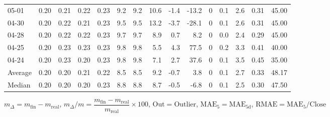 \begin{threeparttable}
{\begin{tabular}{lrrrrrrrrrrrrrr}
  05-01 &          0.20 &          0.21 &          0.22 &        0.23 &                 9.2 &                9.2 &                10.6 &       -1.4 &        -13.2 &              0 &                 0.1 &              2.6 &            0.31 &                  45.00 \\
  04-30 &          0.20 &          0.22 &          0.21 &        0.23 &                 9.5 &                9.5 &                13.2 &       -3.7 &        -28.1 &              0 &                 0.1 &              2.6 &            0.31 &                  45.00 \\
  04-28 &          0.20 &          0.22 &          0.22 &        0.23 &                 9.7 &                9.7 &                 8.9 &        0.7 &          8.2 &              0 &                 0.0 &              2.4 &            0.29 &                  45.00 \\
  04-25 &          0.20 &          0.23 &          0.23 &        0.23 &                 9.8 &                9.8 &                 5.5 &        4.3 &         77.5 &              0 &                 0.2 &              3.3 &            0.41 &                  40.00 \\
  04-24 &          0.20 &          0.23 &          0.20 &        0.23 &                 9.8 &                9.8 &                 7.1 &        2.7 &         37.6 &              0 &                 0.1 &              3.5 &            0.45 &                  35.00 \\
Average &          0.20 &          0.20 &          0.21 &        0.22 &                 8.5 &                8.5 &                 9.2 &       -0.7 &          3.8 &              0 &                 0.1 &              2.7 &            0.33 &                  48.17 \\
 Median &          0.20 &          0.20 &          0.20 &        0.23 &                 8.8 &                8.8 &                 8.7 &       -0.5 &         -6.8 &              0 &                 0.1 &              2.5 &            0.30 &                  47.50 \\
\bottomrule
\end{tabular}
}
\begin{tablenotes}\footnotesize
\item $m_\Delta=m_{\text{fin}}-m_{\text{real}}$,
$m_\Delta/m=\dfrac{m_{\text{fin}}-m_{\text{real}}}{m_{\text{real}}}\times100$,
$\mathrm{Out}=\text{Outlier}$,
$\mathrm{MAE}_5=\mathrm{MAE}_{5\text{d}}$,
$\mathrm{RMAE}=\mathrm{MAE}_5/\text{Close}$
\end{tablenotes}
\end{threeparttable}
\endgroup

